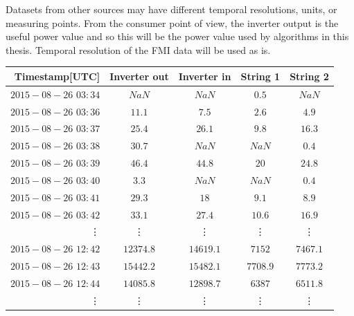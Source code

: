 Datasets from other sources may have different temporal resolutions, units, or measuring points. From the consumer point of view, the inverter output is the useful power value and so this will be the power value used by algorithms in this thesis. Temporal resolution of the FMI data will be used as is.


\begin{table}[h]

\centering

\begin{tabular}{r|cccc} \hline\hline

Timestamp[UTC] & Inverter out & Inverter in & String 1 & String 2\\ \hline
$2015-08-26$ $03:34$ & $NaN$ & $NaN$ & $0.5$ & $NaN$\\
$2015-08-26$ $03:36$ & $11.1$ & $7.5$ & $2.6$ & $4.9$\\
$2015-08-26$ $03:37$ & $25.4$ & $26.1$ & $9.8$ & $16.3$\\
$2015-08-26$ $03:38$ & $30.7$& $NaN$ & $NaN$ & $0.4$\\
$2015-08-26$ $03:39$ & $46.4$& $44.8$ & $20$ & $24.8$\\
$2015-08-26$ $03:40$ & $3.3$ & $NaN$ & $NaN$ & $0.4$\\
$2015-08-26$ $03:41$ & $29.3$ &  $18$ & $9.1$ & $8.9$\\
$2015-08-26$ $03:42$ & $33.1$& $27.4$ & $10.6$ & $16.9$\\

\vdots & \vdots & \vdots & \vdots & \vdots\\
$2015-08-26$ $12:42$ & $12374.8$ & $14619.1$ & $7152$ & $7467.1$\\
$2015-08-26$ $12:43$ & $15442.2$ & $15482.1 $& $7708.9$ & $7773.2$\\
$2015-08-26$ $12:44$ & $14085.8$ & $12898.7$ & $6387$ & $6511.8$ \\
\vdots & \vdots & \vdots & \vdots & \vdots\\

\hline\hline
\end{tabular}

\label{table_fmi_kumpula_csv}
\end{table}





